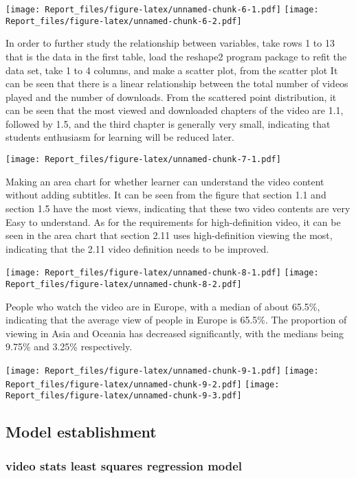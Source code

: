 \documentclass[
]{article}
\begin{document}
\texttt{[image: Report\_files/figure-latex/unnamed-chunk-6-1.pdf]}
\texttt{[image: Report\_files/figure-latex/unnamed-chunk-6-2.pdf]}

In order to further study the relationship between variables, take rows
1 to 13 that is the data in the first table, load the reshape2 program
package to refit the data set, take 1 to 4 columns, and make a scatter
plot, from the scatter plot It can be seen that there is a linear
relationship between the total number of videos played and the number of
downloads. From the scattered point distribution, it can be seen that
the most viewed and downloaded chapters of the video are 1.1, followed
by 1.5, and the third chapter is generally very small, indicating that
students enthusiasm for learning will be reduced later.

\texttt{[image: Report\_files/figure-latex/unnamed-chunk-7-1.pdf]}

Making an area chart for whether learner can understand the video
content without adding subtitles. It can be seen from the figure that
section 1.1 and section 1.5 have the most views, indicating that these
two video contents are very Easy to understand. As for the requirements
for high-definition video, it can be seen in the area chart that section
2.11 uses high-definition viewing the most, indicating that the 2.11
video definition needs to be improved.

\texttt{[image: Report\_files/figure-latex/unnamed-chunk-8-1.pdf]}
\texttt{[image: Report\_files/figure-latex/unnamed-chunk-8-2.pdf]}

People who watch the video are in Europe, with a median of about 65.5\%,
indicating that the average view of people in Europe is 65.5\%. The
proportion of viewing in Asia and Oceania has decreased significantly,
with the medians being 9.75\% and 3.25\% respectively.

\texttt{[image: Report\_files/figure-latex/unnamed-chunk-9-1.pdf]}
\texttt{[image: Report\_files/figure-latex/unnamed-chunk-9-2.pdf]}
\texttt{[image: Report\_files/figure-latex/unnamed-chunk-9-3.pdf]}

\hypertarget{model-establishment}{%
\subsection{Model establishment}\label{model-establishment}}

\hypertarget{video-stats-least-squares-regression-model}{%
\subsubsection{video stats least squares regression
model}\label{video-stats-least-squares-regression-model}}
\end{document}
